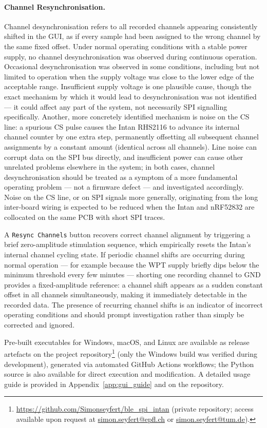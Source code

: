 \paragraph{Channel Resynchronisation.}
Channel desynchronisation refers to all recorded channels appearing
consistently shifted in the GUI, as if every sample had been assigned to the
wrong channel by the same fixed offset. Under normal operating conditions with a
stable power supply, no channel desynchronisation was observed during continuous
operation. Occasional
desynchronisation was observed in some conditions, including but not limited to
operation when the supply voltage was close to the lower edge of the acceptable
range. Insufficient supply voltage is one plausible cause, though the exact
mechanism by which it would lead to desynchronisation was not identified --- it
could affect any part of the system, not necessarily SPI signalling specifically.
Another, more concretely identified mechanism is noise on the CS line: a spurious
CS pulse causes the Intan RHS2116 to advance its internal channel counter by one
extra step, permanently offsetting all subsequent channel assignments by a
constant amount (identical across all channels). Line noise can corrupt data on
the SPI bus directly, and insufficient power can cause other unrelated problems
elsewhere in the system; in both cases, channel desynchronisation should be
treated as a symptom of a more fundamental operating problem --- not a firmware
defect --- and investigated accordingly. Noise on the CS line, or on SPI signals
more generally, originating from the long inter-board wiring is expected to be
reduced when the Intan and nRF52832 are collocated on the same PCB with short SPI
traces.

A \texttt{Resync Channels} button recovers correct channel alignment by
triggering a brief zero-amplitude stimulation sequence, which empirically
resets the Intan's internal channel cycling state. If periodic channel shifts are occurring during normal operation --- for example
because the WPT supply briefly dips below the minimum threshold every few minutes
--- shorting one recording channel to GND provides a fixed-amplitude reference:
a channel shift appears as a sudden constant offset in all channels simultaneously,
making it immediately detectable in the recorded data. The presence of recurring
channel shifts is an indicator of incorrect operating conditions and should prompt
investigation rather than simply be corrected and ignored.

Pre-built executables for Windows, macOS, and Linux are available as release
artefacts on the project repository\footnote{\url{https://github.com/Simonseyfert/ble_spi_intan}
(private repository; access available upon request at
\href{mailto:simon.seyfert@epfl.ch}{simon.seyfert@epfl.ch} or
\href{mailto:simon.seyfert@tum.de}{simon.seyfert@tum.de}).}
(only the Windows build was verified during development),
generated via automated GitHub Actions workflows; the Python source is also
available for direct execution and modification. A detailed usage guide is provided in
Appendix~\ref{app:gui_guide} and on the repository.


